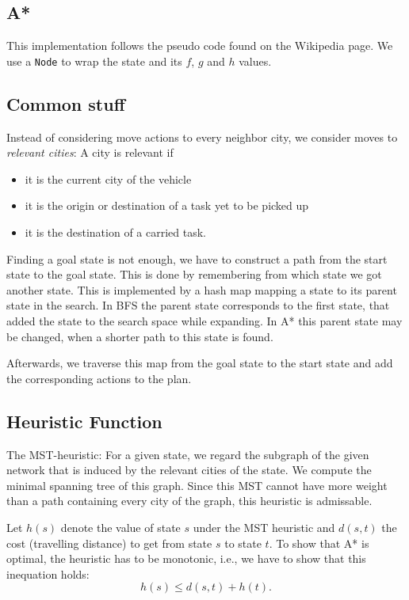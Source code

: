 \documentclass[11pt]{article}
\begin{document}
\subsection{A*}
This implementation follows the pseudo code found on the Wikipedia page.
We use a \texttt{Node} to wrap the state and its $f$, $g$ and $h$ values.



\subsection{Common stuff}
Instead of considering move actions to every neighbor city, we consider moves to \emph{relevant cities}:
A city is relevant if 
\begin{itemize}
	\item it is the current city of the vehicle
	\item it is the origin or destination of a task yet to be picked up
	\item it is the destination of a carried task.
\end{itemize}

Finding a goal state is not enough, we have to construct a path from the start state to the goal state.
This is done by remembering from which state we got another state.
This is implemented by a hash map mapping a state to its parent state in the search.
In BFS the parent state corresponds to the first state, that added the state to the search space while expanding.
In A* this parent state may be changed, when a shorter path to this state is found.

Afterwards, we traverse this map from the goal state to the start state and add the corresponding actions to the plan.

\subsection{Heuristic Function}
The MST-heuristic:
For a given state, we regard the subgraph of the given network that is induced by the relevant cities of the state.
We compute the minimal spanning tree of this graph.
Since this MST cannot have more weight than a path containing every city of the graph, this heuristic is admissable.

Let $h(s)$ denote the value of state $s$ under the MST heuristic and $d(s,t)$ the cost (travelling distance) to get from state $s$ to state $t$.
To show that A* is optimal, the heuristic has to be monotonic, i.e., we have to show that this inequation holds:
\[ h(s) \leq d(s,t) +h(t) .\]
\end{document}
